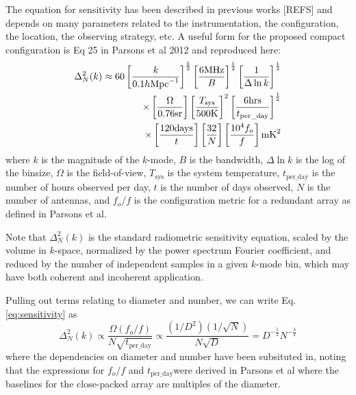 \documentclass[ars]{/Users/daviddeboer1/Documents/Papers/Copernicus_LaTeX_Package_v_2_7/copernicus}
\begin{document}
The equation for sensitivity has been described in previous works [REFS] and depends on many parameters
related to the instrumentation, the configuration, the location, the observing strategy, etc.  A useful form for 
the proposed compact configuration is Eq 25 in Parsons et al 2012 and reproduced here:
\begin{equation}
\centering
\label{eq:sensitivity}
\begin{split}
\Delta^2_N(k) \approx 60 \left[\frac{k}{0.1h\text{Mpc}^{-1}}\right]^\frac{5}{2}
                                         \left[\frac{6 \text{MHz}}{B}\right]^\frac{1}{2}
                                         \left[\frac{1}{\Delta\ln k}\right]^\frac{1}{2} \\
                        \times       \left[\frac{\Omega}{0.76\text{sr}}\right]
                                         \left[\frac{T_\text{sys}}{500 \text{K}}\right]^2
                                         \left[\frac{6 \text{hrs}}{t_\text{per\_day}}\right]^\frac{1}{2} \\
                        \times       \left[\frac{120\text{days}}{t}\right]
                                         \left[\frac{32}{N}\right]
                                         \left[\frac{\text{10}^4f_o}{f}\right]  \text{mK}^2
\end{split}
\end{equation}
where $k$ is the magnitude of the $k$-mode, $B$ is the bandwidth, $\Delta\ln k$ is the log
of the binsize, $\Omega$ is the field-of-view, $T_{\text{sys}}$ is the system temperature, 
${t_\text{per\_day}}$ is the number of hours observed per day, $t$ is the number of days
observed, $N$ is the number of antennas, and $f_o/f$ is the configuration metric for a 
redundant array as defined in Parsons et al.

Note that $\Delta^2_N(k)$ is the standard radiometric sensitivity equation, scaled by
the volume in $k$-space, normalized by the power spectrum Fourier coefficient, and
reduced by the number of independent samples in a given $k$-mode bin, which may have
both coherent and incoherent application.

Pulling out terms relating to diameter and number, we can write Eq. \ref{eq:sensitivity} as
\begin{equation}
\label{eq:reducedSensitivity}
\Delta^2_N(k) \propto \frac{\Omega (f_o/f)}{N\sqrt{t_\text{per\_day}}} \propto \frac{(1/D^2)(1/\sqrt{N})}{N\sqrt{D}}
= D^{-\frac{5}{2}}N^{-\frac{3}{2}}
\end{equation}
where the dependencies on diameter and number have been subsituted in, noting that the expressions for $f_o/f$ and 
$t_\text{per\_day}$were derived in Parsons et al where the baselines for the close-packed array are multiples of the diameter.
\end{document}
